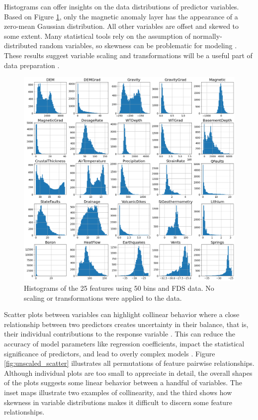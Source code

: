Histograms can offer insights on the data distributions of predictor variables. Based on Figure \ref{fig:unscaled_hists}, only the magnetic anomaly layer has the appearance of a zero-mean Gaussian distribution. All other variables are offset and skewed to some extent. Many statistical tools rely on the assumption of normally-distributed random variables, so skewness can be problematic for modeling \citep[p.\ 85]{montgomery_statistical_2012}. These results suggest variable scaling and transformations will be a useful part of data preparation \citep[p.\ 221]{montgomery_statistical_2012}. 

\begin{figure}[!htp]
\centering
\includegraphics[width=\textwidth]{templates/images/Figure-Unscaled_Histograms.png}
\caption[Unconditioned FDS histograms]{Histograms of the 25 features using 50 bins and FDS data. No scaling or transformations were applied to the data.}
\label{fig:unscaled_hists}
\end{figure}

Scatter plots between variables can highlight collinear behavior where a close relationship between two predictors creates uncertainty in their balance, that is, their individual contributions to the response variable \citep[p.\ 99]{james_introduction_2013}. This can reduce the accuracy of model parameters like regression coefficients, impact the statistical significance of predictors, and lead to overly complex models \citep[p.\ 100-101]{james_introduction_2013}. Figure \ref{fig:unscaled_scatter} illustrates all permutations of feature pairwise relationships. Although individual plots are too small to appreciate in detail, the overall shapes of the plots suggests some linear behavior between a handful of variables. The inset maps illustrate two examples of collinearity, and the third shows how skewness in variable distributions makes it difficult to discern some feature relationships.

